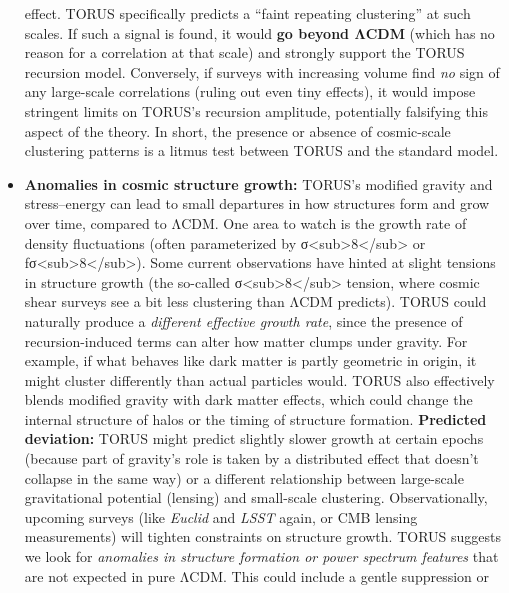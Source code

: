 \documentclass[
]{article}
\begin{document}
\begin{itemize}
  effect\hspace{0pt}. TORUS specifically predicts a ``faint repeating
  clustering'' at such scales\hspace{0pt}. If such a signal is found, it
  would \textbf{go beyond ΛCDM} (which has no reason for a correlation
  at that scale) and strongly support the TORUS recursion model.
  Conversely, if surveys with increasing volume find \emph{no} sign of
  any large-scale correlations (ruling out even tiny effects), it would
  impose stringent limits on TORUS's recursion amplitude, potentially
  falsifying this aspect of the theory\hspace{0pt}. In short, the
  presence or absence of cosmic-scale clustering patterns is a litmus
  test between TORUS and the standard model.
\item
  \textbf{Anomalies in cosmic structure growth:} TORUS's modified
  gravity and stress--energy can lead to small departures in how
  structures form and grow over time, compared to ΛCDM. One area to
  watch is the growth rate of density fluctuations (often parameterized
  by σ\textless sub\textgreater8\textless/sub\textgreater{} or
  fσ\textless sub\textgreater8\textless/sub\textgreater). Some current
  observations have hinted at slight tensions in structure growth (the
  so-called σ\textless sub\textgreater8\textless/sub\textgreater{}
  tension, where cosmic shear surveys see a bit less clustering than
  ΛCDM predicts). TORUS could naturally produce a \emph{different
  effective growth rate}, since the presence of recursion-induced terms
  can alter how matter clumps under gravity. For example, if what
  behaves like dark matter is partly geometric in origin, it might
  cluster differently than actual particles would. TORUS also
  effectively blends modified gravity with dark matter effects, which
  could change the internal structure of halos or the timing of
  structure formation. \textbf{Predicted deviation:} TORUS might predict
  slightly slower growth at certain epochs (because part of gravity's
  role is taken by a distributed effect that doesn't collapse in the
  same way) or a different relationship between large-scale
  gravitational potential (lensing) and small-scale clustering.
  Observationally, upcoming surveys (like \emph{Euclid} and \emph{LSST}
  again, or CMB lensing measurements) will tighten constraints on
  structure growth. TORUS suggests we look for \emph{anomalies in
  structure formation or power spectrum features} that are not expected
  in pure ΛCDM\hspace{0pt}. This could include a gentle suppression or

\end{itemize}
\end{document}
